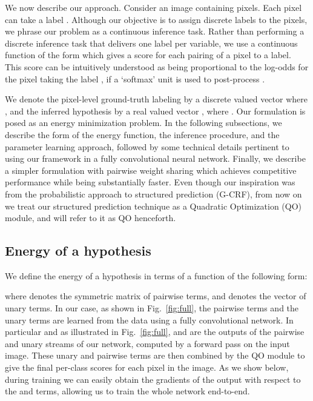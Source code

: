 \documentclass[runningheads]{llncs}
\begin{document}
We now describe our approach. 
Consider an image  containing  pixels. Each pixel  can take a label . 
Although our objective is to assign discrete labels to the pixels, we phrase our problem as a continuous inference task. Rather than performing a discrete inference task that delivers one label per variable, we use
a continuous function of the form  which gives a score for each pairing of a pixel to a label. 
This score can be intuitively
understood as being proportional to the log-odds for the pixel  taking the label , if a `softmax' unit is used to post-process .

We denote the pixel-level ground-truth labeling by a discrete valued vector  where , and the inferred hypothesis by
a real valued vector , where . 
Our formulation is posed as an energy minimization problem. In the following subsections, we
describe the form of the energy function, the inference procedure, and the parameter learning approach, followed by some technical
details pertinent to using our framework in a fully convolutional neural network. Finally, we describe a simpler formulation with pairwise weight sharing  which 
achieves competitive performance while being substantially faster. Even though our inspiration was from the probabilistic approach to structured prediction (G-CRF),
from now on we treat our structured prediction technique as a Quadratic Optimization (QO) module, and will refer to it as QO henceforth.

\subsection{Energy of a hypothesis} We define the energy of a hypothesis in terms of a function of the following form:



\noindent where  denotes the symmetric  matrix of pairwise terms, and  denotes the  vector of unary terms.
In our case, as shown in Fig.~\ref{fig:full}, the pairwise terms  and the unary terms  are learned from the data using a fully convolutional network. In particular and as illustrated in 
Fig.~\ref{fig:full},
 and  are the outputs of the pairwise and unary streams of our network, computed by a forward pass on the input image. These unary 
and pairwise terms are then combined by the QO module to give the final per-class scores for each pixel in the image. As we show below, during training we can easily obtain the gradients of the output with respect to the  and  terms, allowing us to train the whole network end-to-end. 
\end{document}
